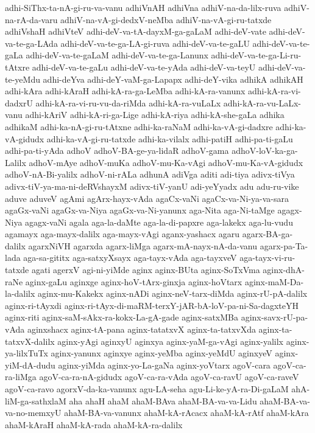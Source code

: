 {adhi-SiThx-ta-nA-gi-ru-va-vanu
adhiVnAH
adhiVna
adhiV-na-da-lilx-ruva
adhiV-na-rA-da-varu
adhiV-na-vA-gi-dedxV-neMba
adhiV-na-vA-gi-ru-tatxde
adhiVshaH
adhiVteV
adhi-deV-va-tA-dayxM-ga-gaLaM
adhi-deV-vate
adhi-deV-va-te-ga-LAda
adhi-deV-va-te-ga-LA-gi-ruva
adhi-deV-va-te-gaLU
adhi-deV-va-te-gaLa
adhi-deV-va-te-gaLaM
adhi-deV-va-te-ga-Lanunx
adhi-deV-va-te-ga-Li-ru-tAtxre
adhi-deV-va-te-gaLu
adhi-deV-va-te-yAda
adhi-deV-va-teyU
adhi-deV-va-te-yeMdu
adhi-deYva
adhi-deY-vaM-ga-Lapapx
adhi-deY-vika
adhikA
adhikAH
adhi-kAra
adhi-kAraH
adhi-kA-ra-ga-LeMba
adhi-kA-ra-vanunx
adhi-kA-ra-vi-dadxrU
adhi-kA-ra-vi-ru-vu-da-riMda
adhi-kA-ra-vuLaLx
adhi-kA-ra-vu-LaLx-vanu
adhi-kAriV
adhi-kA-ri-ga-Lige
adhi-kA-riya
adhi-kA-she-gaLa
adhika
adhikaM
adhi-ka-nA-gi-ru-tAtxne
adhi-ka-raNaM
adhi-ka-vA-gi-dadxre
adhi-ka-vA-gidudx
adhi-ka-vA-gi-ru-tatxde
adhi-ka-vilalx
adhi-patiH
adhi-pa-ti-gaLu
adhi-pa-ti-yAda
adhoV
adhoV-BA-ge-ya-lidaR
adhoV-gama
adhoV-loV-ka-ga-Lalilx
adhoV-mAye
adhoV-muKa
adhoV-mu-Ka-vAgi
adhoV-mu-Ka-vA-gidudx
adhoV-nA-Bi-yalilx
adhoV-ni-rALa
adhunA
adiVga
aditi
adi-tiya
adivx-tiVya
adivx-tiV-ya-ma-ni-deRVshayxM
adivx-tiV-yanU
adi-yeYyadx
adu
adu-ru-vike
aduve
aduveV
agAmi
agArx-hayx-vAda
agaCx-vaNi
agaCx-va-Ni-ya-va-sara
agaGx-vaNi
agaGx-va-Niya
agaGx-va-Ni-yanunx
aga-Nita
aga-Ni-taMge
agagx-Niya
agagx-vaNi
agala
aga-la-daMte
aga-la-di-papxre
aga-lakekx
aga-lu-vudu
agamayx
aga-mayx-dalilx
aga-mayx-vAgi
aganx-yashacx
agaru
agarx-BA-ga-dalilx
agarxNiVH
agarxda
agarx-liMga
agarx-mA-nayx-nA-da-vanu
agarx-pa-Ta-lada
aga-sa-gititx
aga-satxyXsayx
aga-tayx-vAda
aga-tayxveV
aga-tayx-vi-ru-tatxde
agati
agerxV
agi-ni-yiMde
aginx
aginx-BUta
aginx-SoTxVma
aginx-dhA-raNe
aginx-gaLu
aginxge
aginx-hoV-tArx-ginxja
aginx-hoVtarx
aginx-maM-Da-la-dalilx
aginx-mu-Kakekx
aginx-nADi
aginx-neV-tarx-diMda
aginx-rU-pA-dalilx
aginx-ri-tAyxdi
aginx-ri-tAyx-di-maRM-terxY-jAR-bA-loV-pa-ni-Sa-dagxteYH
aginx-riti
aginx-saM-sAkx-ra-kokx-La-gA-gade
aginx-satxMBa
aginx-savx-rU-pa-vAda
aginxshacx
aginx-tA-pana
aginx-tatatxvX
aginx-ta-tatxvXda
aginx-ta-tatxvX-dalilx
aginx-yAgi
aginxyU
aginxya
aginx-yaM-ga-vAgi
aginx-yalilx
aginx-ya-lilxTuTx
aginx-yanunx
aginxye
aginx-yeMba
aginx-yeMdU
aginxyeV
aginx-yiM-dA-dudu
aginx-yiMda
aginx-yo-La-gaNa
aginx-yoVtarx
agoV-cara
agoV-ca-ra-liMga
agoV-ca-ra-nA-gidudx
agoV-ca-ra-vAda
agoV-ca-ravU
agoV-ca-raveV
agoV-ca-ravo
agorxV-da-ka-vanunx
agu-LA-seha
agu-Li-ke-yA-ra-Di-gaLaM
ahA-liM-ga-sathxlaM
aha
ahaH
ahaM
ahaM-BAva
ahaM-BA-va-va-Lidu
ahaM-BA-va-va-no-memxyU
ahaM-BA-va-vanunx
ahaM-kA-rAcacx
ahaM-kA-rAtf
ahaM-kAra
ahaM-kAraH
ahaM-kA-rada
ahaM-kA-ra-dalilx
}
